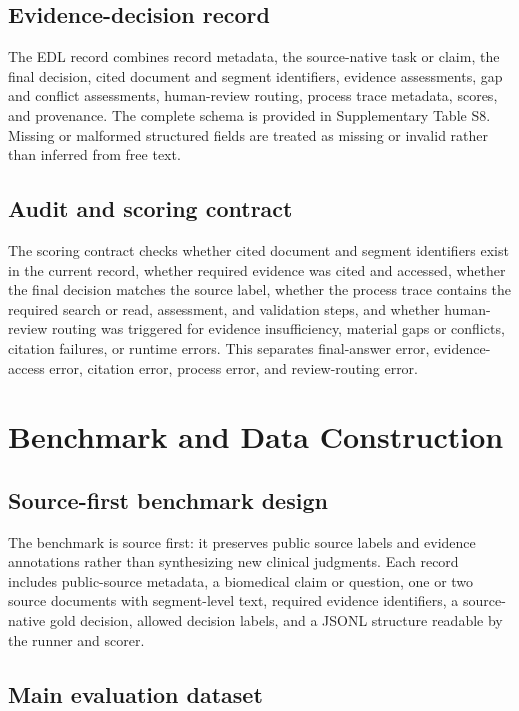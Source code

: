 \documentclass[11pt,a4paper]{article}
\begin{document}
\subsection{Evidence-decision record}

The EDL record combines record metadata, the source-native task or claim, the final decision, cited document and segment identifiers, evidence assessments, gap and conflict assessments, human-review routing, process trace metadata, scores, and provenance. The complete schema is provided in Supplementary Table S8. Missing or malformed structured fields are treated as missing or invalid rather than inferred from free text.

\subsection{Audit and scoring contract}

The scoring contract checks whether cited document and segment identifiers exist in the current record, whether required evidence was cited and accessed, whether the final decision matches the source label, whether the process trace contains the required search or read, assessment, and validation steps, and whether human-review routing was triggered for evidence insufficiency, material gaps or conflicts, citation failures, or runtime errors. This separates final-answer error, evidence-access error, citation error, process error, and review-routing error.

\section{Benchmark and Data Construction}

\subsection{Source-first benchmark design}

The benchmark is source first: it preserves public source labels and evidence annotations rather than synthesizing new clinical judgments. Each record includes public-source metadata, a biomedical claim or question, one or two source documents with segment-level text, required evidence identifiers, a source-native gold decision, allowed decision labels, and a JSONL structure readable by the runner and scorer.

\subsection{Main evaluation dataset}
\end{document}
